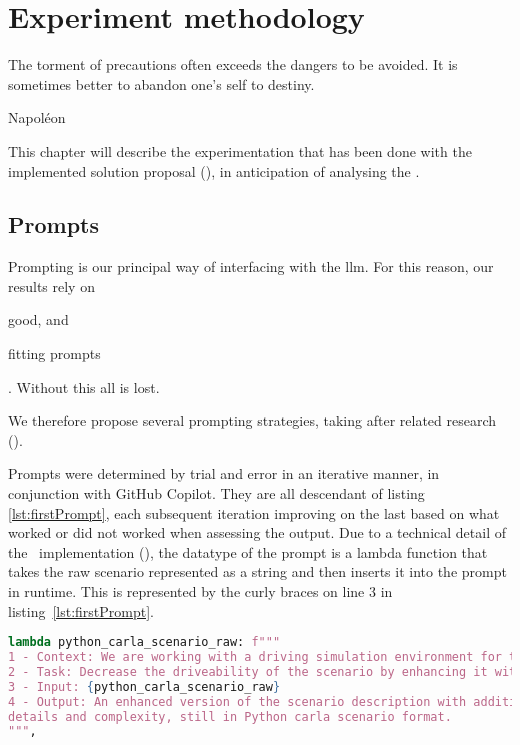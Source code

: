 \chapter{Experiment methodology}\label{chp:experiments}

\epigraph{The torment of precautions often exceeds the dangers to be avoided. It is sometimes better to abandon one's self to destiny.}{Napoléon}

This chapter will describe the experimentation that has been done with the implemented solution
proposal (), in anticipation of analysing the .

\section{Prompts}

Prompting is our principal way of interfacing with the \acrshort{llm}. For this reason, our results
rely on \begin{inparaenum}
    \item good, and
    \item fitting prompts
\end{inparaenum}. Without this all is lost.

We therefore propose several prompting strategies, taking after related research
().

Prompts were determined by trial and error in an iterative manner, in
conjunction with GitHub Copilot. They are all descendant of listing
\ref{lst:firstPrompt}, each subsequent iteration improving on the last based on
what worked or did not worked when assessing the output.
Due to a technical detail of the
\hefe~implementation (), the datatype of the prompt is
a lambda function that takes the raw scenario represented as a string and then
inserts it into the prompt in runtime. This is represented by the curly braces
on line \num{3} in listing~\ref{lst:firstPrompt}.

\begin{lstlisting}[caption={The first prompt.}, label={lst:firstPrompt}, language={Python}]
lambda python_carla_scenario_raw: f"""
1 - Context: We are working with a driving simulation environment for the Carla simulator.
2 - Task: Decrease the driveability of the scenario by enhancing it with more details and complexity.
3 - Input: {python_carla_scenario_raw}
4 - Output: An enhanced version of the scenario description with additional
details and complexity, still in Python carla scenario format.
""",
\end{lstlisting}

